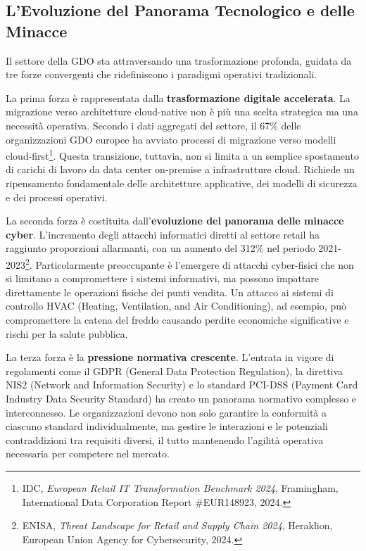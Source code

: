 \subsection{L'Evoluzione del Panorama Tecnologico e delle Minacce}

Il settore della GDO sta attraversando una trasformazione profonda, guidata da tre forze convergenti che ridefiniscono i paradigmi operativi tradizionali.

La prima forza è rappresentata dalla \textbf{trasformazione digitale accelerata}. La migrazione verso architetture cloud-native non è più una scelta strategica ma una necessità operativa. Secondo i dati aggregati del settore, il 67\% delle organizzazioni GDO europee ha avviato processi di migrazione verso modelli cloud-first\footnote{IDC, \textit{European Retail IT Transformation Benchmark 2024}, Framingham, International Data Corporation Report \#EUR148923, 2024.}. Questa transizione, tuttavia, non si limita a un semplice spostamento di carichi di lavoro da data center on-premise a infrastrutture cloud. Richiede un ripensamento fondamentale delle architetture applicative, dei modelli di sicurezza e dei processi operativi.

La seconda forza è costituita dall'\textbf{evoluzione del panorama delle minacce cyber}. L'incremento degli attacchi informatici diretti al settore retail ha raggiunto proporzioni allarmanti, con un aumento del 312\% nel periodo 2021-2023\footnote{ENISA, \textit{Threat Landscape for Retail and Supply Chain 2024}, Heraklion, European Union Agency for Cybersecurity, 2024.}. Particolarmente preoccupante è l'emergere di attacchi cyber-fisici che non si limitano a compromettere i sistemi informativi, ma possono impattare direttamente le operazioni fisiche dei punti vendita. Un attacco ai sistemi di controllo HVAC (Heating, Ventilation, and Air Conditioning), ad esempio, può compromettere la catena del freddo causando perdite economiche significative e rischi per la salute pubblica.

La terza forza è la \textbf{pressione normativa crescente}. L'entrata in vigore di regolamenti come il GDPR (General Data Protection Regulation), la direttiva NIS2 (Network and Information Security) e lo standard PCI-DSS (Payment Card Industry Data Security Standard) ha creato un panorama normativo complesso e interconnesso. Le organizzazioni devono non solo garantire la conformità a ciascuno standard individualmente, ma gestire le interazioni e le potenziali contraddizioni tra requisiti diversi, il tutto mantenendo l'agilità operativa necessaria per competere nel mercato.

